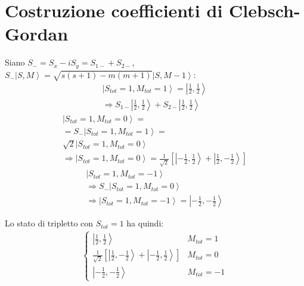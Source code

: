 \section[Coefficienti di Clebsch-Gordan]{Costruzione coefficienti di Clebsch-Gordan} %
Siano $S_-=S_x-iS_y=S_{1-}+S_{2-}$, $S_-\left |S,M \right\rangle=\sqrt{s\left(s+1\right)-m\left(m+1\right)}\left |S,M-1 \right\rangle$:
\begin{equation}\begin{split}
\left |S_{tot}=1,M_{tot}=1 \right\rangle=\left |\frac{1}{2},\frac{1}{2} \right\rangle\\
\Longrightarrow S_{1-}\left |\frac{1}{2},\frac{1}{2} \right\rangle+S_{2-}\left |\frac{1}{2},\frac{1}{2} \right\rangle
\end{split}\end{equation}
\begin{equation}\begin{split}
\left |S_{tot}=1,M_{tot}=0 \right\rangle=\\
=S_-\left |S_{tot}=1,M_{tot}=1 \right\rangle=\\
\sqrt{2}\left |S_{tot}=1,M_{tot}=0 \right\rangle\\
\Longrightarrow \left |S_{tot}=1,M_{tot}=0 \right\rangle=\frac{1}{\sqrt{2}}\left[\left |-\frac{1}{2},\frac{1}{2} \right\rangle+\left |\frac{1}{2},-\frac{1}{2} \right\rangle\right]
\end{split}\end{equation}
\begin{equation}\begin{split}
\left |S_{tot}=1,M_{tot}=-1 \right\rangle\\
\Longrightarrow S_-\left |S_{tot}=1,M_{tot}=0 \right\rangle\\
\Longrightarrow \left |S_{tot}=1,M_{tot}=-1 \right\rangle=\left |-\frac{1}{2},-\frac{1}{2} \right\rangle
\end{split}\end{equation}

Lo stato di tripletto con $S_{tot}=1$ ha quindi:
\begin{equation}\begin{split}
\begin{cases}
\left |\frac{1}{2},\frac{1}{2} \right\rangle & M_{tot}=1\\
\frac{1}{\sqrt{2}}\left[\left |\frac{1}{2},-\frac{1}{2} \right\rangle +\left |-\frac{1}{2},\frac{1}{2} \right\rangle \right] & M_{tot}=0\\
\left |-\frac{1}{2},-\frac{1}{2} \right\rangle & M_{tot}=-1
\end{cases}
\end{split}\end{equation}


